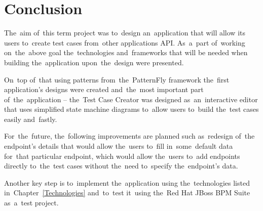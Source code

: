 

\chapter{Conclusion}
The~aim of~this term project was to~design an~application that will allow its
users to~create test cases from~other applications API. As~a~part of~working
on~the~above goal the~technologies and~frameworks that will be needed when
building the~application upon~the~design were presented.

On~top of~that using patterns from~the~PatternFly framework the~first
application's designs were created and~the~most important part
of~the~application -- the~Test Case Creator was designed as~an~interactive
editor that uses simplified state machine diagrams to~allow users to~build the~test
cases easily and~fastly.

For~the~future, the~following improvements are planned such as~redesign of~the
endpoint's details that would allow the~users to~fill in~some~default data
for~that particular endpoint, which would allow the~users to~add endpoints
directly to~the~test cases without the~need to~specify the~endpoint's data.

Another key step is to~implement the~application using the~technologies listed
in~Chapter~\ref{Technologies} and~to~test it~using the~Red Hat JBoss BPM Suite
as~a~test project.



